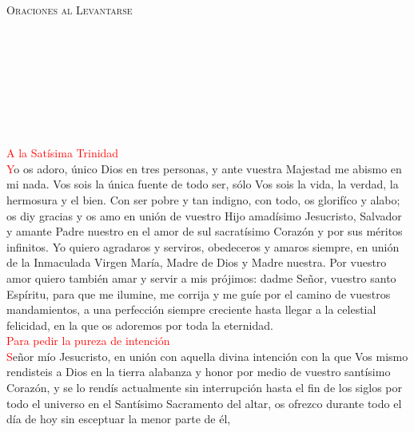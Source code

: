 \documentclass[9pt]{article}
\begin{document}
\begin{multicols}{2}

      \begin{center}
            \textsc{\Large{Oraciones al Levantarse}}
      \end{center}
      \\[1mm]
      \begin{otherlanguage}{latin}
            \\[1mm]
            \\[1mm]
            \\[1mm]
            \\[1mm]
            \\[-3mm]
      \end{otherlanguage}
      \textcolor{red}{A la Satísima Trinidad}\\
      \textcolor{red}{Y}o os adoro, único Dios en tres personas, y ante vuestra Majestad me abismo en mi nada. Vos sois la única fuente de todo ser, sólo Vos sois la vida, la verdad, la hermosura
      y el bien. Con ser pobre y tan indigno, con todo, os glorifíco y alabo; os diy gracias y os amo en unión de vuestro Hijo amadísimo Jesucristo, Salvador y amante Padre nuestro en el amor de sul
      sacratísimo Corazón y por sus méritos infinitos. Yo quiero agradaros y serviros, obedeceros y amaros siempre, en unión de la Inmaculada Virgen María, Madre de Dios y Madre nuestra.
      Por vuestro amor quiero también amar y servir a mis prójimos: dadme Señor, vuestro santo Espíritu, para que me ilumine, me corrija y me guíe por el camino de vuestros mandamientos, a una
      perfección siempre creciente hasta llegar a la celestial felicidad, en la que os adoremos por toda la eternidad.\\[1mm]
      \textcolor{red}{Para pedir la pureza de intención}\\
      \textcolor{red}{S}eñor mío Jesucristo, en unión con aquella divina intención con la que Vos mismo rendisteis a Dios en la tierra alabanza y honor por medio de vuestro santísimo Corazón, y se lo rendís
      actualmente sin interrupción hasta el fin de los siglos por todo el universo en el Santísimo Sacramento del altar, os ofrezco durante todo el día de hoy sin esceptuar la menor parte de él,

\end{multicols}
\end{document}
